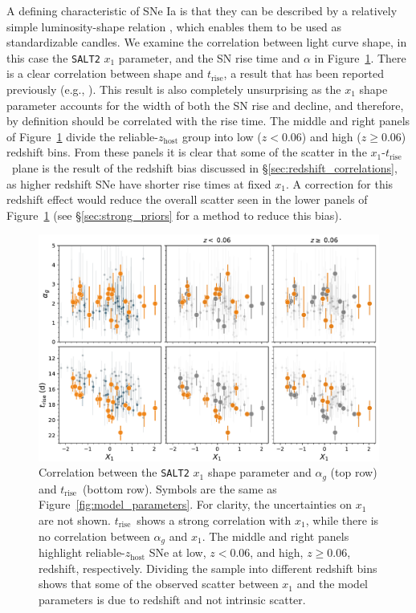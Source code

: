 \documentclass[twocolumn]{./aastex63}
\newcommand{\trise}{$t_\mathrm{rise}$}
\begin{document}
A defining characteristic of SNe Ia is that they can be described by a
relatively simple luminosity-shape relation \citep{Phillips93}, which enables
them to be used as standardizable candles. We examine the correlation between
light curve shape, in this case the \texttt{SALT2} $x_1$ parameter, and the SN
rise time and $\alpha$ in Figure~\ref{fig:shape_correlations}. There is a clear
correlation between shape and \trise, a result that has been reported previously
(e.g., \citealt{Riess99a,Firth15,Zheng17a}). This result is also completely
unsurprising as the $x_1$ shape parameter accounts for the width of both the SN
rise and decline, and therefore, by definition should be correlated with the
rise time. The middle and right panels of Figure~\ref{fig:shape_correlations}
divide the reliable-$z_\mathrm{host}$ group into low ($z < 0.06$) and high ($z
\ge 0.06$) redshift bins. From these panels it is clear that some of the scatter
in the $x_1$-\trise\ plane is the result of the redshift bias discussed in
\S\ref{sec:redshift_correlations}, as higher redshift SNe have shorter rise
times at fixed $x_1$. A correction for this redshift effect would reduce the
overall scatter seen in the lower panels of Figure~\ref{fig:shape_correlations}
(see \S\ref{sec:strong_priors} for a method to reduce this bias).

\begin{figure}
    \centering
    \includegraphics[width=6in]{./figures/shape_correlations.pdf}
    \caption{Correlation between the \texttt{SALT2} $x_1$ shape parameter and
    $\alpha_g$ (top row) and \trise\ (bottom row). Symbols are the same as
    Figure~\ref{fig:model_parameters}. For clarity, the uncertainties on $x_1$
    are not shown. \trise\ shows a strong correlation with $x_1$, while there
    is no correlation between $\alpha_g$ and $x_1$. The middle and right
    panels highlight reliable-$z_\mathrm{host}$ SNe at low, $z < 0.06$, and
    high, $z \ge 0.06$, redshift, respectively. Dividing the sample into
    different redshift bins shows that some of the observed scatter between
    $x_1$ and the model parameters is due to redshift and not intrinsic
    scatter. }
    \label{fig:shape_correlations}
\end{figure}
\end{document}
